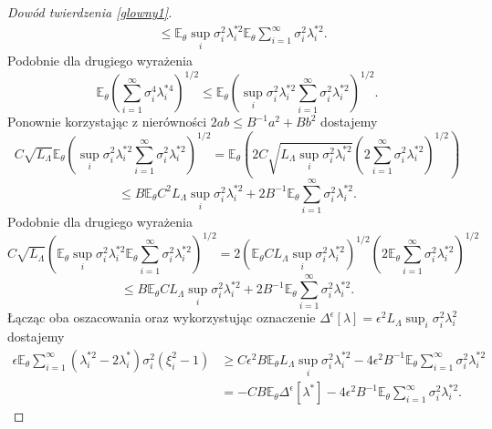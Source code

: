 \documentclass[man,mfiu]{mgrwms}
\begin{document}
\begin{proof}[Dowód twierdzenia \ref{glowny1}]
\begin{displaymath}
\begin{split}
&\leq \mathbb{E}_{\theta}\sup_i\sigma_i^2\lambda_i^{*2}\mathbb{E}_{\theta}\sum_{i=1}^{\infty}\sigma_i^2\lambda_i^{*2}.
\end{split}
\end{displaymath}
Podobnie dla drugiego wyrażenia
\begin{displaymath}
\mathbb{E}_{\theta}\left(\sum_{i=1}^{\infty}\sigma_i^4\lambda_i^{*4}\right)^{1/2}\leq \mathbb{E}_{\theta}\left(\sup_i\sigma_i^2\lambda_i^{*2}\sum_{i=1}^{\infty}\sigma_i^2\lambda_i^{*2}\right)^{1/2}.
\end{displaymath}
Ponownie korzystając z nierówności $2ab\leq B^{-1}a^2+Bb^2$ dostajemy
\begin{displaymath}
C\sqrt{L_{\Lambda}}\mathbb{E}_{\theta}\left(\sup_i\sigma_i^2\lambda_i^{*2}\sum_{i=1}^{\infty}\sigma_i^2\lambda_i^{*2}\right)^{1/2}=\mathbb{E}_{\theta}\left(2C\sqrt{L_{\Lambda}\sup_i\sigma_i^2\lambda_i^{*2}}\left(2\sum_{i=1}^{\infty}\sigma_i^2\lambda_i^{*2}\right)^{1/2}\right)
\end{displaymath}
\begin{displaymath}
\leq B\mathbb{E}_{\theta}C^2L_{\Lambda}\sup_i\sigma_i^2\lambda_i^{*2}+2B^{-1}\mathbb{E}_{\theta}\sum_{i=1}^{\infty}\sigma_i^2\lambda_i^{*2}.
\end{displaymath}
Podobnie dla drugiego wyrażenia
\begin{displaymath}
C\sqrt{L_{\Lambda}}\left(\mathbb{E}_{\theta}\sup_i\sigma_i^2\lambda_i^{*2}\mathbb{E}_{\theta}\sum_{i=1}^{\infty}\sigma_i^2\lambda_i^{*2}\right)^{1/2}=2\left(\mathbb{E}_{\theta}CL_{\Lambda}\sup_i\sigma_i^2\lambda_i^{*2}\right)^{1/2}\left(2\mathbb{E}_{\theta}\sum_{i=1}^{\infty}\sigma_i^2\lambda_i^{*2}\right)^{1/2}
\end{displaymath}
\begin{displaymath}
\leq B\mathbb{E}_{\theta}CL_{\Lambda}\sup_i\sigma_i^2\lambda_i^{*2}+2B^{-1}\mathbb{E}_{\theta}\sum_{i=1}^{\infty}\sigma_i^2\lambda_i^{*2}.
\end{displaymath}
Łącząc oba oszacowania oraz wykorzystując oznaczenie $\Delta^{\epsilon}[\lambda]=\epsilon^2L_{\Lambda}\sup_i\sigma_i^2\lambda_i^2$ dostajemy
\begin{equation}\label{szacowanie2}
\begin{split}
\epsilon\mathbb{E}_{\theta}\sum_{i=1}^{\infty}(\lambda_i^{*2}-2\lambda_i^*)\sigma_i^2(\xi_i^2-1)
&\geq C\epsilon^2 B\mathbb{E}_{\theta}L_{\Lambda}\sup_i\sigma_i^2\lambda_i^{*2}-4\epsilon^2B^{-1}\mathbb{E}_{\theta}\sum_{i=1}^{\infty}\sigma_i^2\lambda_i^{*2}\\
&=-CB\mathbb{E}_{\theta}\Delta^{\epsilon}[\lambda^*]-4\epsilon^2B^{-1}\mathbb{E}_{\theta}\sum_{i=1}^{\infty}\sigma_i^2\lambda_i^{*2}.

\end{split}
\end{equation}
\end{proof}
\end{document}

